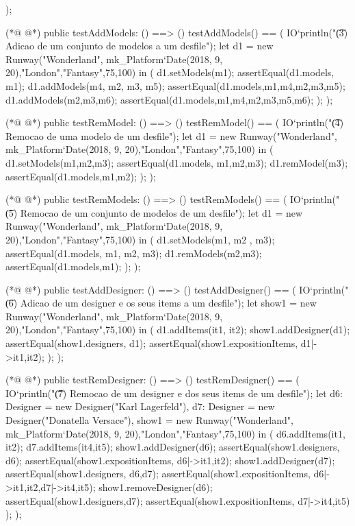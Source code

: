 \begin{vdmpp}[breaklines=true]
 );
 
(*@
\label{testAddModels:59}
@*)
 public testAddModels: () ==> ()
 testAddModels() == (
  IO`println("\t (3) Adicao de um conjunto de modelos a um desfile");
   let d1 = new Runway("Wonderland", mk_Platform`Date(2018, 9, 20),"London","Fantasy",75,100) in (
    d1.setModels({m1});
    assertEqual(d1.models, {m1});
    d1.addModels({m4, m2, m3, m5});
    assertEqual(d1.models,{m1,m4,m2,m3,m5});
    d1.addModels({m2,m3,m6});
    assertEqual(d1.models,{m1,m4,m2,m3,m5,m6});
  );
 );
 
(*@
\label{testRemModel:72}
@*)
 public testRemModel: () ==> ()
 testRemModel() == (
  IO`println("\t (4) Remocao de uma modelo de um desfile");
   let d1 = new Runway("Wonderland", mk_Platform`Date(2018, 9, 20),"London","Fantasy",75,100) in (
    d1.setModels({m1,m2,m3});
    assertEqual(d1.models, {m1,m2,m3});
    d1.remModel(m3);
    assertEqual(d1.models,{m1,m2});
  );
 );
 
(*@
\label{testRemModels:83}
@*)
  public testRemModels: () ==> ()
  testRemModels() == (
  IO`println("\t (5) Remocao de um conjunto de modelos de um desfile");
   let d1 = new Runway("Wonderland", mk_Platform`Date(2018, 9, 20),"London","Fantasy",75,100) in (
    d1.setModels({m1, m2 , m3});
    assertEqual(d1.models, {m1, m2, m3});
    d1.remModels({m2,m3});
    assertEqual(d1.models,{m1});
  );
 );
 
(*@
\label{testAddDesigner:94}
@*)
 public testAddDesigner: () ==> ()
 testAddDesigner() == (
  IO`println("\t (6) Adicao de um designer e os seus items a um desfile");
  let show1 = new Runway("Wonderland", mk_Platform`Date(2018, 9, 20),"London","Fantasy",75,100) in (
    d1.addItems({it1, it2});
    show1.addDesigner(d1);
    assertEqual(show1.designers, {d1});
    assertEqual(show1.expositionItems, {d1|->{it1,it2}});
  );
 );
 
(*@
\label{testRemDesigner:105}
@*)
 public testRemDesigner: () ==> ()
 testRemDesigner() == (
  IO`println("\t (7) Remocao de um designer e dos seus items de um desfile");
  let d6: Designer = new Designer("Karl Lagerfeld"),
    d7: Designer = new Designer("Donatella Versace"),
  show1 = new Runway("Wonderland", mk_Platform`Date(2018, 9, 20),"London","Fantasy",75,100) in (
    d6.addItems({it1, it2});
    d7.addItems({it4,it5});
    show1.addDesigner(d6);
    assertEqual(show1.designers, {d6});
    assertEqual(show1.expositionItems, {d6|->{it1,it2}});
    show1.addDesigner(d7);
    assertEqual(show1.designers, {d6,d7});
    assertEqual(show1.expositionItems, {d6|->{it1,it2},d7|->{it4,it5}});
    show1.removeDesigner(d6);
    assertEqual(show1.designers,{d7});
    assertEqual(show1.expositionItems, {d7|->{it4,it5}})
  );
 );
 

\end{vdmpp}
